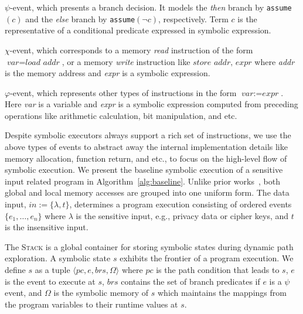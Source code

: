\documentclass[sigconf]{acmart}
\newcommand{\textcode}[1]{\texttt{#1}}
\newcommand{\pcon}{\mathit{pc}}
\begin{document}
\begin{itemize*}
  \item $\psi$-event, which presents a branch decision. It models the 
    \textit{then} branch by \textcode{assume$(c)$} and the \textit{else} 
    branch by \textcode{assume$(\neg c)$}, respectively. Term $\textit{c}$ 
    is the representative of a conditional predicate expressed in symbolic 
    expression. 

  \item $\chi$-event, which corresponds to a memory \textit{read} instruction 
    of the form $\textit{var}=\textit{load~addr}$, or a memory \textit{write} 
    instruction like $\textit{store~addr, expr}$ where \textit{addr} is the 
    memory address and \textit{expr} is a symbolic expression.

  \item $\varphi$-event, which represents other types of instructions in the 
    form $\textit{var}:=\textit{expr}$. Here \textit{var} is a variable and 
    \textit{expr} is a symbolic expression computed from preceding operations 
    like arithmetic calculation, bit manipulation, and etc.
\end{itemize*}


Despite symbolic executors always support a rich set of instructions, we use 
the above types of events to abstract away the internal implementation details 
like memory allocation, function return, and etc., to focus on the high-level 
flow of symbolic execution. 
We present the baseline symbolic execution of a sensitive input related 
program in Algorithm~\ref{alg:baseline}. Unlike prior works~\cite{GuoKWYG15,GuoWW18}, 
both global and local memory accesses are grouped into one uniform form. The 
data input, $\mathit{in}:=\{\lambda,t\}$, determines a program execution consisting 
of ordered events $\{e_1,\ldots,e_n\}$ where $\mathit{\lambda}$ is the sensitive 
input, e.g., privacy data or cipher keys, and $\mathit{t}$ is the insensitive 
input.


The \textsc{Stack} is a global container for storing symbolic states during 
dynamic path exploration. A symbolic state $\mathit{s}$ exhibits the frontier 
of a program execution. We define $\mathit{s}$ as a tuple $\langle \pcon, 
\mathit{e}, \mathit{brs}, \Omega \rangle$ where $\pcon$ is the path condition 
that leads to $\mathit{s}$, $\mathit{e}$ is the event to execute at $\mathit{s}$, 
$\mathit{brs}$ contains the set of branch predicates if $\mathit{e}$ is a $\psi$ 
event, and $\Omega$ is the symbolic memory of $\mathit{s}$ which maintains the
mappings from the program variables to their runtime values at $\mathit{s}$.
\end{document}
